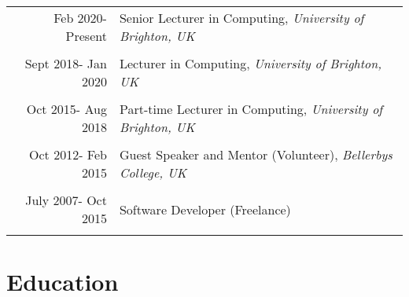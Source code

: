 \documentclass[a4paper,11pt]{article} %
\begin{document}
\begin{tabular}{r|p{11cm}}

Feb 2020- Present & Senior Lecturer in Computing, \emph{University of Brighton, UK}\\
\multicolumn{2}{c}{} \\


Sept 2018- Jan 2020 & Lecturer in Computing, \emph{University of Brighton, UK}\\
\multicolumn{2}{c}{} \\


Oct 2015- Aug 2018 & Part-time Lecturer in Computing, \emph{University of Brighton, UK}\\
\multicolumn{2}{c}{} \\


Oct 2012- Feb 2015 & Guest Speaker and Mentor (Volunteer), \emph{Bellerbys College, UK}\\
\multicolumn{2}{c}{} \\

July 2007- Oct 2015 & Software Developer (Freelance)\\
\multicolumn{2}{c}{} \\

\end{tabular}


\section{Education}
\end{document}

